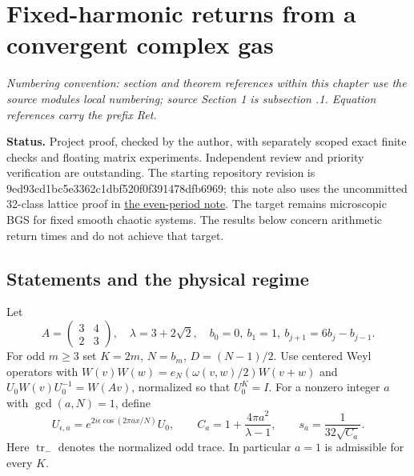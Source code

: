 \hypertarget{fixed-harmonic-returns-from-a-convergent-complex-gas}{%
\section{Fixed-harmonic returns from a convergent complex gas}\label{fixed-harmonic-returns-from-a-convergent-complex-gas}}
\par\smallskip\noindent\emph{Numbering convention: section and theorem references within this chapter use the source module\textquotesingle s local numbering; source Section 1 is subsection \thesection.1. Equation references carry the prefix Ret.}\par\smallskip

\textbf{Status.} Project proof, checked by the author, with separately scoped exact finite
checks and floating matrix experiments. Independent review and priority
verification are outstanding. The starting repository revision is
9ed93cd1bc5e3362c1dbf520f0f391478dfb6969; this note also uses the uncommitted
32-class lattice proof in \href{https://github.com/ChurilovMaksim/BGS/blob/main/mathematics/resonance-cohomology/even_period_spin_resonance.md}{the even-period note}.
The target remains microscopic BGS for fixed smooth chaotic systems.
The results below concern arithmetic return times and do not achieve that target.

\hypertarget{statements-and-the-physical-regime}{%
\subsection{Statements and the physical regime}\label{statements-and-the-physical-regime}}

Let
\[
 A=\begin{pmatrix}3&4\\2&3\end{pmatrix},\quad
 \lambda=3+2\sqrt2,\quad b_0=0,\ b_1=1,\ b_{j+1}=6b_j-b_{j-1}.
\]
For odd \(m\ge3\) set \(K=2m\), \(N=b_m\), \(D=(N-1)/2\).
Use centered Weyl operators with
\(W(v)W(w)=e_N(\omega(v,w)/2)W(v+w)\) and
\(U_0W(v)U_0^{-1}=W(Av)\), normalized so that \(U_0^K=I\).
For a nonzero integer \(a\) with \(\gcd(a,N)=1\), define
\[
 U_{\epsilon,a}=e^{2i\epsilon\cos(2\pi ax/N)}U_0,\qquad
 C_a=1+\frac{4\pi a^2}{\lambda-1},\qquad
 s_a=\frac1{32\sqrt{C_a}}.                                  \tag{Ret.G1}
\]
Here \(\operatorname{tr}_-\) denotes the normalized odd trace.
In particular \(a=1\) is admissible for every \(K\).

